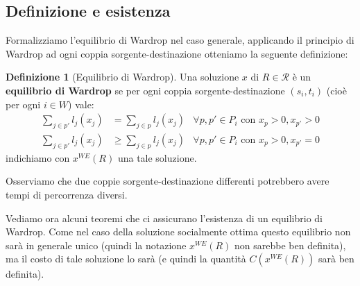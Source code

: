 \documentclass[a4paper]{article}
\theoremstyle{plain}
\theoremstyle{definition}
\newtheorem{mydef}[myteo]{Definizione}
\theoremstyle{remark}
\newcommand{\pa}[1]{\left(#1\right)}
\begin{document}
\subsection{Definizione e esistenza}
\label{sec:wardrop-definizione}

Formalizziamo l'equilibrio di Wardrop nel caso generale, applicando il
principio di Wardrop ad ogni coppia sorgente-destinazione otteniamo la
seguente definizione:
\begin{mydef}[Equilibrio di Wardrop]
  \label{def:wardrop}
  Una soluzione $x$ di $R\in \mathcal{R}$ è un \textbf{equilibrio di
    Wardrop} se per ogni coppia sorgente-destinazione $(s_i,t_i)$
  (cioè per ogni $i\in W$) vale:
  \begin{align*}
    \sum _{j\in p'} l_j(x_j) &= \sum _{j\in p} l_j(x_j) & \forall
                                                           p,p'\in P_i \text{ con } x_p >0, x_{p'} >0 \\
    \sum _{j\in p'} l_j(x_j) &\ge \sum _{j\in p} l_j(x_j) & \forall
                                                             p,p'\in P_i \text{ con } x_p >0, x_{p'} =0 
  \end{align*}
  indichiamo con $x^{WE}(R)$ una tale soluzione.
\end{mydef}

Osserviamo che due coppie sorgente-destinazione differenti potrebbero
avere tempi di percorrenza diversi.

Vediamo ora alcuni teoremi che ci assicurano l'esistenza di un
equilibrio di Wardrop. Come nel caso della soluzione socialmente
ottima questo equilibrio non sarà in generale unico (quindi la
notazione $x^{WE}(R)$ non sarebbe ben definita), ma il costo di tale
soluzione lo sarà (e quindi la quantità $C\pa{x^{WE}\pa{R}}$ sarà ben
definita).
\end{document}

